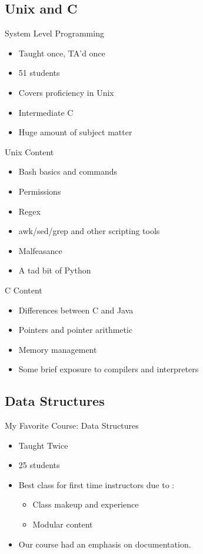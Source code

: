 \documentclass[11pt]{beamer}
\begin{document}
\subsection{Unix and C}

\begin{frame}{System Level Programming}
	\begin{itemize}
		\item Taught once, TA'd once
		\item 51 students
		\item Covers proficiency in Unix
		\item Intermediate C
		\item Huge amount of subject matter
	\end{itemize}
\end{frame}

\begin{frame}{Unix Content}
	\begin{itemize}
		\item Bash basics and commands
		\item Permissions
		\item Regex
		\item awk/sed/grep and other scripting tools
		\item Malfeasance
		\item A tad bit of Python
		
	\end{itemize}
	
\end{frame}

\begin{frame}{C Content}
	\begin{itemize}
		\item Differences between C and Java
		\item Pointers and pointer arithmetic
		\item Memory management
		\item Some brief exposure to compilers and interpreters
	\end{itemize}
	
\end{frame}

\subsection{Data Structures}

\begin{frame}{My Favorite Course: Data Structures}
	\begin{itemize}
		\item Taught Twice
		\item 25 students
		\item Best class for first time instructors due to :
			\begin{itemize}
				\item Class makeup and experience
				\item Modular content
			\end{itemize}
		\item Our course had an emphasis on documentation. 
	\end{itemize}
	
\end{frame}
\end{document}

